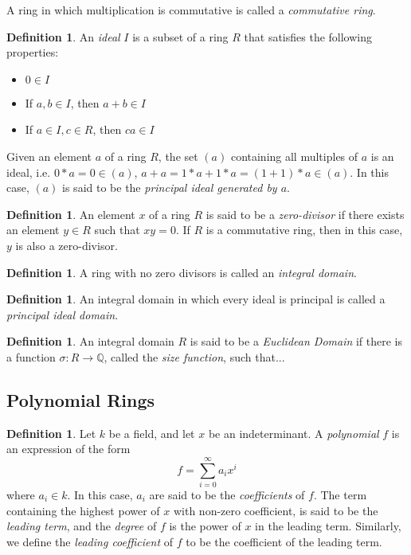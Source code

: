 \documentclass{amsart}
\theoremstyle{definition}
\newtheorem{definition}[theorem]{Definition}
\theoremstyle{remark}
\numberwithin{equation}{section}
\begin{document}
{A ring in which multiplication is commutative is called a \emph{commutative ring}.


\begin{definition}
  An \emph{ideal} $I$ is a subset of a ring $R$ that satisfies the following properties:
  \begin{itemize}
  \item $0 \in I$
  \item If $a, b \in I$, then $a + b \in I$
  \item If $a \in I, c \in R$, then $ca \in I$
  \end{itemize}
\end{definition}

Given an element $a$ of a ring $R$, the set $(a)$ containing all multiples of $a$ is an ideal, i.e. $0*a = 0 \in (a)$, $a + a = 1*a + 1*a = (1 + 1)*a \in (a)$. In this case, $(a)$ is said to be the \emph{principal ideal generated by $a$}.


\begin{definition}
  An element $x$ of a ring $R$ is said to be a \emph{zero-divisor} if there exists an element $y \in R$ such that $xy = 0$. If $R$ is a commutative ring, then in this case, $y$ is also a zero-divisor.
\end{definition}

\begin{definition}
  A ring with no zero divisors is called an \emph{integral domain}.
\end{definition}

\begin{definition}
  An integral domain in which every ideal is principal is called a \emph{principal ideal domain}.
\end{definition}

\begin{definition}
  An integral domain $R$ is said to be a \emph{Euclidean Domain} if there is a function $\sigma: R \to \mathbb{Q}$, called the \emph{size function}, such that...
\end{definition}

\subsection{Polynomial Rings}

\begin{definition}
  Let $k$ be a field, and let $x$ be an indeterminant. A \emph{polynomial} $f$ is an expression of the form
  \begin{equation*}
  f = \sum_{i = 0}^\infty a_ix^i
  \end{equation*}
  where $a_i \in k$. In this case, $a_i$ are said to be the \emph{coefficients} of $f$. The term containing the highest power of $x$ with non-zero coefficient, is said to be the \emph{leading term}, and the \emph{degree} of $f$ is the power of $x$ in the leading term. Similarly, we define the \emph{leading coefficient} of $f$ to be the coefficient of the leading term.
\end{definition}

}
\end{document}
